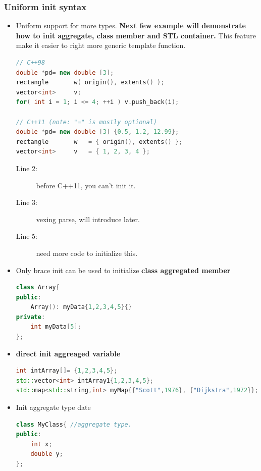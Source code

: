 \documentclass[a4paper,11pt,twoside]{book}
\begin{document}
\subsubsection{Uniform init syntax}
\begin{itemize}

\item Uniform support for more types. \textbf{Next few example will demonstrate how to init aggregate, class member and STL container.} This feature make it easier to right more generic template function. 
\begin{lstlisting}[frame=single, language=c++,mathescape=true]
// C++98 
double *pd= new double [3];
rectangle       w( origin(), extents() );     
vector<int>     v;
for( int i = 1; i <= 4; ++i ) v.push_back(i);

// C++11 (note: "=" is mostly optional)
double *pd= new double [3] {0.5, 1.2, 12.99};
rectangle       w   = { origin(), extents() }; 
vector<int>     v   = { 1, 2, 3, 4 };
\end{lstlisting}
\begin{description}
	\item[Line 2:] before C++11, you can't init it.
	
	\item[Line 3:] vexing parse, will introduce later.
	
	\item[Line 5:] need more code  to initialize this.
\end{description}
	
	\item Only brace init can be used to initialize \textbf{class aggregated member}

\begin{lstlisting}[frame=single, language=c++,mathescape=true]
class Array{
public:
	Array(): myData{1,2,3,4,5}{}    
private:
	int myData[5];
};
\end{lstlisting}

\item \textbf{direct init aggreaged variable}
\begin{lstlisting}[frame=single, language=c++,mathescape=true]
int intArray[]= {1,2,3,4,5};   
std::vector<int> intArray1{1,2,3,4,5};  
std::map<std::string,int> myMap{{"Scott",1976}, {"Dijkstra",1972}};
\end{lstlisting}
	
\item Init aggregate type date
\begin{lstlisting}[frame=single, language=c++,mathescape=true]
class MyClass{ //aggregate type.
public: 
	int x;
	double y;
};
	

\end{lstlisting}
\end{itemize}
\end{document}
